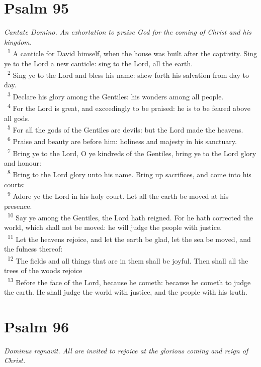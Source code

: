 \documentclass[a5paper,12pt]{article}
\begin{document}
\begin{multicols*}{2}
\section{Psalm 95}
\label{sec:orgd4fa109}
\emph{Cantate Domino. An exhortation to praise God for the coming of Christ and his kingdom.}\\

~\textsuperscript{1} A canticle for David himself, when the house was built after the captivity. Sing ye to the Lord a new canticle: sing to the Lord, all the earth.\\
~\textsuperscript{2} Sing ye to the Lord and bless his name: shew forth his salvation from day to day.\\
~\textsuperscript{3} Declare his glory among the Gentiles: his wonders among all people.\\
~\textsuperscript{4} For the Lord is great, and exceedingly to be praised: he is to be feared above all gods.\\
~\textsuperscript{5} For all the gods of the Gentiles are devils: but the Lord made the heavens.\\
~\textsuperscript{6} Praise and beauty are before him: holiness and majesty in his sanctuary.\\
~\textsuperscript{7} Bring ye to the Lord, O ye kindreds of the Gentiles, bring ye to the Lord glory and honour:\\
~\textsuperscript{8} Bring to the Lord glory unto his name. Bring up sacrifices, and come into his courts:\\
~\textsuperscript{9} Adore ye the Lord in his holy court. Let all the earth be moved at his presence.\\
~\textsuperscript{10} Say ye among the Gentiles, the Lord hath reigned. For he hath corrected the world, which shall not be moved: he will judge the people with justice.\\
~\textsuperscript{11} Let the heavens rejoice, and let the earth be glad, let the sea be moved, and the fulness thereof:\\
~\textsuperscript{12} The fields and all things that are in them shall be joyful. Then shall all the trees of the woods rejoice\\
~\textsuperscript{13} Before the face of the Lord, because he cometh: because he cometh to judge the earth. He shall judge the world with justice, and the people with his truth.\\

\section{Psalm 96}
\label{sec:org8b9c318}
\emph{Dominus regnavit. All are invited to rejoice at the glorious coming and reign of Christ.}\\


\end{multicols*}
\end{document}
